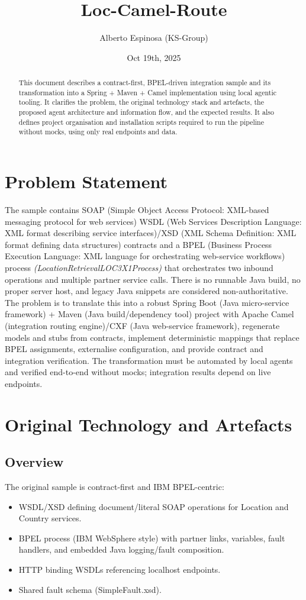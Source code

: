 \documentclass[11pt,a4paper]{article}
\title{Loc-Camel-Route}
\author{Alberto Espinosa (KS-Group)}
\date{Oct 19th, 2025}
\begin{document}
\maketitle
\begin{abstract}
This document describes a contract-first, BPEL-driven integration sample and its transformation into a Spring + Maven + Camel implementation using local agentic tooling. It clarifies the problem, the original technology stack and artefacts, the proposed agent architecture and information flow, and the expected results. It also defines project organisation and installation scripts required to run the pipeline without mocks, using only real endpoints and data.
\end{abstract}


\section{Problem Statement}
The sample contains SOAP (Simple Object Access Protocol: XML-based messaging protocol for web services) WSDL (Web Services Description Language: XML format describing service interfaces)/XSD (XML Schema Definition: XML format defining data structures) contracts and a BPEL (Business Process Execution Language: XML language for orchestrating web-service workflows) process \emph{(LocationRetrievalLOC3X1Process)} that orchestrates two inbound operations and multiple partner service calls. There is no runnable Java build, no proper server host, and legacy Java snippets are considered non-authoritative. The problem is to translate this into a robust Spring Boot (Java micro-service framework) + Maven (Java build/dependency tool) project with Apache Camel (integration routing engine)/CXF (Java web-service framework), regenerate models and stubs from contracts, implement deterministic mappings that replace BPEL assignments, externalise configuration, and provide contract and integration verification. The transformation must be automated by local agents and verified end-to-end without mocks; integration results depend on live endpoints.

\section{Original Technology and Artefacts}
\subsection{Overview}
The original sample is contract-first and IBM BPEL-centric:
\begin{itemize}
  \item WSDL/XSD defining document/literal SOAP operations for Location and Country services.
  \item BPEL process (IBM WebSphere style) with partner links, variables, fault handlers, and embedded Java logging/fault composition.
  \item HTTP binding WSDLs referencing localhost endpoints.
  \item Shared fault schema (SimpleFault.xsd).
\end{itemize}
\end{document}
